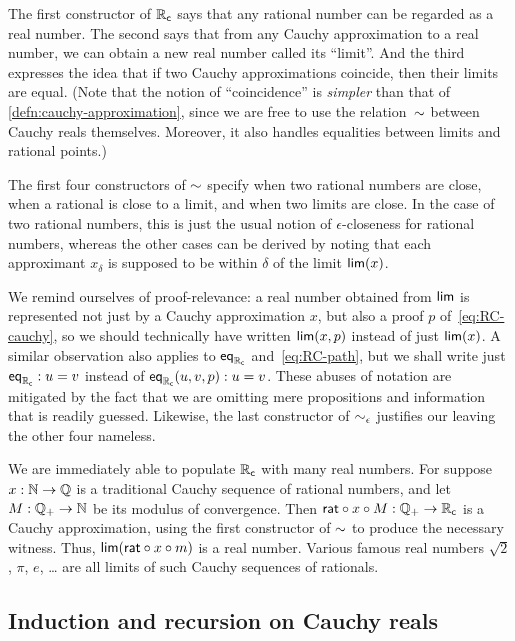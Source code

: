 \mentalpause

The first constructor of $\mathbb{R}_\mathsf{c}$ says that any rational number can be regarded as a real number.
The second says that from any Cauchy approximation to a real number, we can obtain a new real number called its ``limit''.
And the third expresses the idea that if two Cauchy approximations coincide, then their limits are equal.
(Note that the notion of ``coincidence'' is \emph{simpler} than that of \autoref{defn:cauchy-approximation}, since we are free to use the relation~$\mathord\sim$ between Cauchy reals themselves.
Moreover, it also handles equalities between limits and rational points.)

The first four constructors of $\mathord\sim$ specify when two rational numbers are close, when a rational is close to a limit, and when two limits are close.
In the case of two rational numbers, this is just the usual notion of $\epsilon$-closeness for rational numbers, whereas the other cases can be derived by noting that each approximant $x_\delta$ is supposed to be within $\delta$ of the limit $\mathsf{lim}(x)$.

We remind ourselves of proof-relevance: a real number obtained from $\mathsf{lim}$ is represented not
just by a Cauchy approximation $x$, but also a proof $p$ of~\eqref{eq:RC-cauchy}, so we
should technically have written $\mathsf{lim}(x,p)$ instead of just $\mathsf{lim}(x)$.
A similar observation also applies to $\mathsf{eq}_{\mathbb{R}_\mathsf{c}}$ and~\eqref{eq:RC-path}, but we shall write just
$\mathsf{eq}_{\mathbb{R}_\mathsf{c}} : u = v$ instead of $\mathsf{eq}_{\mathbb{R}_\mathsf{c}}(u, v, p) : u = v$. These abuses of notation are
mitigated by the fact that we are omitting mere propositions and information that is
readily guessed.
Likewise, the last constructor of $\mathord{\sim_{\epsilon}}$ justifies our leaving the other four nameless.

We are immediately able to populate $\mathbb{R}_\mathsf{c}$ with many real numbers. For suppose $x : \mathbb{N} \to
\mathbb{Q}$ is a traditional Cauchy sequence of rational numbers, and let $M : \mathbb{Q}_{+} \to \mathbb{N}$ be its
modulus of convergence. Then $\mathsf{rat} \circ x \circ M : \mathbb{Q}_{+} \to \mathbb{R}_\mathsf{c}$ is a Cauchy
approximation, using the first constructor of $\mathord\sim$ to produce the necessary witness.
Thus, $\mathsf{lim}(\mathsf{rat} \circ x \circ m)$ is a real number. Various famous
real numbers $\sqrt{2}$, $\pi$, $e$, \dots{} are all limits of such Cauchy sequences of
rationals.

\subsection{Induction and recursion on Cauchy reals}
\label{sec:induct-recurs-cauchy}

